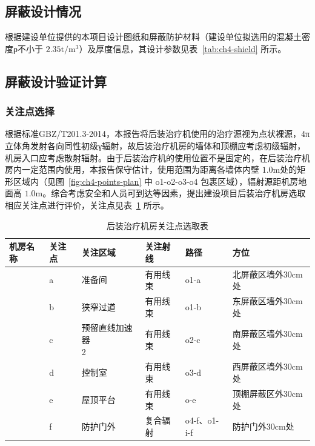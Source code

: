 \subsection{屏蔽设计情况}

根据建设单位提供的本项目设计图纸和屏蔽防护材料（建设单位拟选用的混凝土密度ρ不小于 $2 . 3 5 \mathrm { t } / \mathrm { m } ^ { 3 }$）及厚度信息，其设计参数见表~\ref{tab:ch4-shield} 所示。





\subsection{屏蔽设计验证计算}

\subsubsection{关注点选择}

根据标准GBZ/T201.3-2014，本报告将后装治疗机使用的治疗源视为点状裸源，4π立体角发射各向同性初级γ辐射，故后装治疗机房的墙体和顶棚应考虑初级辐射，机房入口应考虑散射辐射。由于后装治疗机的使用位置不是固定的，在后装治疗机房内一定范围内使用，本报告保守估计，使用范围为距离各墙体内壁 $1 . 0 \mathrm { m }$处的矩形区域内（见图~\ref{fig:ch4-points-plan} 中 o1-o2-o3-o4 包裹区域），辐射源距机房地面高 $1 . 0 \mathrm { m }$。综合考虑安全和人员可到达等因素，提出建设项目后装治疗机房选取相应关注点进行评价，关注点见表~\ref{tab:ch4-points} 所示。


\begin{table}[H]
\centering
\caption{后装治疗机房关注点选取表}
\label{tab:ch4-points}
\setlength{\tabcolsep}{4pt}
\begin{tabular}{|
>{\centering\arraybackslash}m{1.2cm}|
>{\centering\arraybackslash}m{1.0cm}|
>{\centering\arraybackslash}m{3.6cm}|
>{\centering\arraybackslash}m{1.8cm}|
>{\centering\arraybackslash}m{1.2cm}|
>{\centering\arraybackslash}m{5.2cm}|
}
\hline
机房名称 & 关注点 & 关注区域 & 关注射线 & 路径 & 方位 \\
\hline
\multirow{6}{=}{\centering 后装治疗机房}
& a & 准备间 & 有用线束 & o1-a & 北屏蔽区墙外30cm处 \\
\cline{2-6}
& b & 狭窄过道 & 有用线束 & o1-b & 东屏蔽区墙外30cm处 \\
\cline{2-6}
& c & \makecell{预留直线加速器\\2} & 有用线束 & o2-c & 南屏蔽区墙外30cm处 \\
\cline{2-6}
& d & 控制室 & 有用线束 & o3-d & 西屏蔽区墙外30cm处 \\
\cline{2-6}
& e & 屋顶平台 & 有用线束 & o-e & 顶棚屏蔽区外30cm处 \\
\cline{2-6}
& f & 防护门外 & 复合辐射 & o4-f、o1-i-f & 防护门外30cm处 \\
\hline
\end{tabular}
\end{table}



